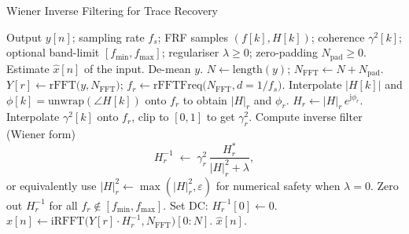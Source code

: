 \documentclass[a4paper,11pt]{article}
\begin{document}
\begin{algorithm}
    \caption{Wiener Inverse Filtering for Trace Recovery}
        \label{alg:inv}
        \begin{algorithmic}[1]
        \Require Output $y[n]$; sampling rate $f_s$; FRF samples $(f[k], H[k])$; coherence $\gamma^2[k]$; optional band-limit $[f_{\min},f_{\max}]$; regulariser $\lambda\ge 0$; zero-padding $N_{\mathrm{pad}}\ge 0$.
        \Ensure Estimate $\hat{x}[n]$ of the input.
        \State De-mean $y$.
        \State $N \gets \text{length}(y)$; $N_{\mathrm{FFT}} \gets N + N_{\mathrm{pad}}$.
        \State $Y[r] \gets \mathrm{rFFT}\big(y, N_{\mathrm{FFT}}\big)$; $f_r \gets \mathrm{rFFTFreq}\big(N_{\mathrm{FFT}}, d=1/f_s\big)$.
        \State Interpolate $|H[k]|$ and $\phi[k]=\mathrm{unwrap}(\angle H[k])$ onto $f_r$ to obtain $|H|_r$ and $\phi_r$.
        \State $H_r \gets |H|_r\,e^{\mathrm{j}\phi_r}$.
        \State Interpolate $\gamma^2[k]$ onto $f_r$, clip to $[0,1]$ to get $\gamma^2_r$.
        \State Compute inverse filter (Wiener form)
        \begin{equation}
        H_r^{-1} \;\gets\; \gamma^2_r \,\frac{H_r^\ast}{|H|_r^2 + \lambda},
        \end{equation}
        or equivalently use $|H|_r^2 \leftarrow \max(|H|_r^2,\varepsilon)$ for numerical safety when $\lambda=0$.
        \State Zero out $H_r^{-1}$ for all $f_r \notin [f_{\min},f_{\max}]$. 
        \EndIf
        \State Set DC: $H_r^{-1}[0]\gets 0$.
        \State $\hat{x}[n] \gets \mathrm{iRFFT}\big(Y[r]\cdot H_r^{-1}, N_{\mathrm{FFT}}\big)[0{:}N]$.
        \State \Return $\hat{x}[n]$.
    \end{algorithmic}
\end{algorithm}
\end{document}
